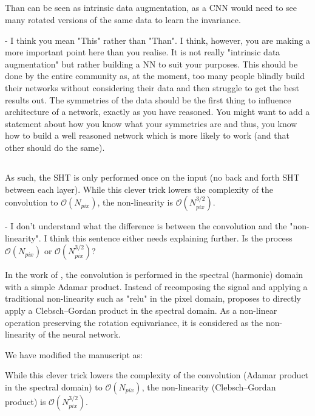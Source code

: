 \documentclass[12pt,a4paper]{article}
\newcommand{\nati}[1]{{\color[rgb]{.1,.6,.1}{NP: #1}}}
\newcommand{\todo}[1]{{\color[rgb]{.6,.1,.6}{TODO: #1}}}
\newcommand{\1}{\b{1}}              %
\newcommand{\0}{\b{0}}              %
\newcommand{\bO}{\mathcal{O}}
\begin{document}
\subsection{}
\begin{mdframed}[style=comment]
Than can be seen as intrinsic data augmentation, as a CNN would need to see many rotated versions of the same data to learn the invariance.

- I think you mean "This" rather than "Than". I think, however, you are making a more important point here than you realise. It is not really "intrinsic data augmentation" but rather building a NN to suit your purposes. This should be done by the entire community as, at the moment, too many people blindly build their networks without considering their data and then struggle to get the best results out. The symmetries of the data should be the first thing to influence architecture of a network, exactly as you have reasoned. You might want to add a statement about how you know what your symmetries are and thus, you know how to build a well reasoned network which is more likely to work (and that other should do the same).
\end{mdframed}
\todo{Assigned: @michael}

\subsection{}
\begin{mdframed}[style=comment]
As such, the SHT is only performed once on the input (no back and forth SHT between each layer). While this clever trick lowers the complexity of the convolution to $\mathcal{O}(N_{pix})$, the non-linearity is $\mathcal{O}(N^{3/2}_{pix})$.

- I don't understand what the difference is between the convolution and the "non-linearity". I think this sentence either needs explaining further. Is the process $\mathcal{O}(N_{pix})$ or $\mathcal{O}(N^{3/2}_{pix})$?
\end{mdframed}
In the work of \cite{kondor2018clebsch}, the convolution is performed in the spectral (harmonic) domain with a simple Adamar product. Instead of recomposing the signal and applying a traditional non-linearity such as "relu" in the pixel domain, \cite{kondor2018clebsch} proposes to directly apply a Clebsch–Gordan product in the spectral domain. As a non-linear operation preserving the rotation equivariance, it is considered as the non-linearity of the neural network.

We have modified the manuscript as:
\begin{mdframed}[style=manuscript]
While this clever trick lowers the complexity of the convolution (Adamar product in the spectral domain) to $\bO(N_{pix})$, the non-linearity (Clebsch–Gordan product) is $\bO(N_{pix}^{3/2})$.
\end{mdframed}
\nati{Should we be clearer in the paper?}
\end{document}
